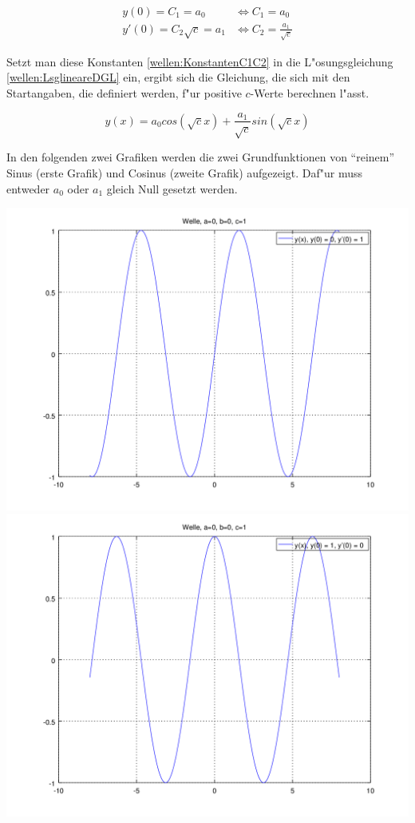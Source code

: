 \begin{refsection}
\begin{equation}
	\begin{split}
		y(0) = C_1 = a_0 &\Leftrightarrow C_1 = a_0 \\
		y'(0) = C_2 \sqrt{c} = a_1 &\Leftrightarrow C_2 = \frac{a_1}{\sqrt{c}}
	\end{split}
	\label{wellen:KonstantenC1C2}
\end{equation}

Setzt man diese Konstanten \ref{wellen:KonstantenC1C2} in die L"osungsgleichung 
\ref{wellen:LsglineareDGL} 
ein, ergibt sich die Gleichung, die sich mit den Startangaben, die definiert 
werden, f"ur positive $c$-Werte berechnen l"asst.

\begin{equation}
	y(x) = a_0 cos(\sqrt{c}x) + \frac{a_1}{\sqrt{c}} sin(\sqrt{c}x)
	\label{wellen:LSGleichung}
\end{equation}

In den folgenden zwei Grafiken werden die zwei Grundfunktionen von ``reinem''
Sinus (erste Grafik) und Cosinus (zweite Grafik) aufgezeigt. Daf"ur muss 
entweder $a_0$ oder $a_1$ gleich Null gesetzt werden.

\noindent
\includegraphics[scale=0.35]{./wellen/octave/images/grundfunktionen/sin.png}
\includegraphics[scale=0.35]{./wellen/octave/images/grundfunktionen/cos.png}


\end{refsection}
